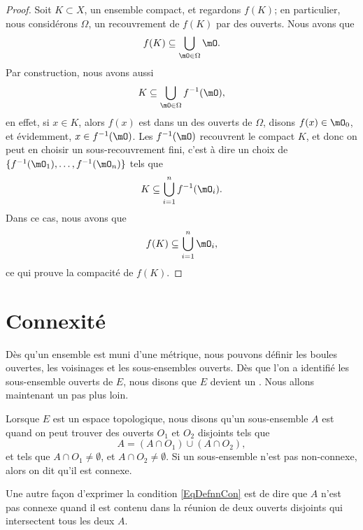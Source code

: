 \begin{proof}
    Soit $K\subset X$, un ensemble compact, et regardons $f(K)$; en particulier, nous considérons $\Omega$, un recouvrement de $f(K)$ par des ouverts. Nous avons que
    \begin{equation}
        f(K)\subseteq\bigcup_{\mO\in\Omega}\mO.
    \end{equation}
    Par construction, nous avons aussi
    \begin{equation}
        K\subseteq\bigcup_{\mO\in\Omega}f^{-1}(\mO),
    \end{equation}
    en effet, si $x\in K$, alors $f(x)$ est dans un des ouverts de $\Omega$, disons $f(x)\in \mO_0$, et évidemment, $x\in f^{-1}(\mO)$.  Les $f^{-1}(\mO)$ recouvrent le compact $K$, et donc on peut en choisir un sous-recouvrement fini, c'est à dire un choix de $\{ f^{-1}(\mO_1),\ldots,f^{-1}(\mO_n) \}$ tels que
    \begin{equation}
        K\subseteq \bigcup_{i=1}^nf^{-1}(\mO_i).
    \end{equation}
    Dans ce cas, nous avons que
    \begin{equation}
        f(K)\subseteq\bigcup_{i=1}^n\mO_i,
    \end{equation}
    ce qui prouve la compacité de $f(K)$.
\end{proof}

\section{Connexité}

Dès qu'un ensemble est muni d'une métrique, nous pouvons définir les boules ouvertes, les voisinages et les sous-ensembles ouverts. Dès que l'on a identifié les sous-ensemble ouverts de $E$, nous disons que $E$ devient un . Nous allons maintenant un pas plus loin.

\begin{definition}  \label{DefIRKNooJJlmiD}
     Lorsque $E$ est un espace topologique, nous disons qu'un sous-ensemble $A$ est  quand on peut trouver des ouverts $O_1$ et $O_2$ disjoints tels que
    \begin{equation}    \label{EqDefnnCon}
        A=(A\cap O_1)\cup (A\cap O_2),
    \end{equation}
    et tels que $A\cap O_1\neq\emptyset$, et $A\cap O_2\neq\emptyset$. Si un sous-ensemble n'est pas non-connexe, alors on dit qu'il est connexe.
\end{definition}
Une autre façon d'exprimer la condition \eqref{EqDefnnCon} est de dire que $A$ n'est pas connexe quand il est contenu dans la réunion de deux ouverts disjoints qui intersectent tous les deux $A$.

